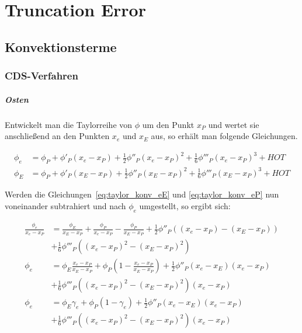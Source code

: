 \documentclass[11pt, ngerman,colorback,accentcolor=tud2d]{tudreport}
\begin{document}
\newcommand{\pder}[2][]{\frac{\partial#1}{\partial#2}}
\newcommand{\pderf}[1]{\frac{\partial f}{\partial#1}}
\newcommand{\pderfs}[1]{\frac{\partial^2 f}{\partial#1}}



\chapter{Truncation Error}
\label{cha:Truncation_Error}


\section{Konvektionsterme}

\subsection{CDS-Verfahren}

\paragraph{Osten}
Entwickelt man die Taylorreihe von $\phi$ um den Punkt $x_P$ und wertet sie anschließend
an den Punkten $x_e$ und $x_E$ aus, so erhält man folgende Gleichungen.

\begin{align}
  \phi_e &= \phi_P + \phi'_P(x_e-x_P)+\frac{1}{2}\phi''_P(x_e-x_P)^2
  +\frac{1}{6}\phi'''_P(x_e-x_P)^3+HOT
  \label{eq:taylor_konv_eP}\\
  \phi_E &= \phi_P + \phi'_P(x_E-x_P)+\frac{1}{2}\phi''_P(x_E-x_P)^2
  +\frac{1}{6}\phi'''_P(x_E-x_P)^3+HOT
  \label{eq:taylor_konv_eE}
\end{align}

Werden die Gleichungen~\eqref{eq:taylor_konv_eE} und \eqref{eq:taylor_konv_eP} nun
voneinander subtrahiert und nach $\phi_e$ umgestellt, so ergibt sich:

\begin{align*}
  \frac{\phi_e}{x_e-x_P} &= \frac{\phi_E}{x_E-x_P} + \frac{\phi_P}{x_e-x_P} -
  \frac{\phi_P}{x_E-x_P} + \frac{1}{2} \phi''_P \left({(x_e-x_P)-(x_E-x_P)}\right)\\
  &+ \frac{1}{6} \phi'''_P \left({(x_e-x_P)^2-(x_E-x_P)^2}\right)\\
  \phi_e &= \phi_E \frac{x_e-x_P}{x_E-x_P} + \phi_P \left({1-\frac{x_e-x_P}{x_E-x_P} }\right)
  + \frac{1}{2} \phi''_P (x_e-x_E)(x_e-x_P)\\
  &+ \frac{1}{6} \phi'''_P \left({(x_e-x_P)^2-(x_E-x_P)^2}\right)(x_e-x_P)\\
  \phi_e &= \phi_E \gamma_e + \phi_P (1-\gamma_e)+ \frac{1}{2} \phi''_P (x_e-x_E)(x_e-x_P)\\
         &+ \frac{1}{6} \phi'''_P \left({(x_e-x_P)^2-(x_E-x_P)^2}\right)(x_e-x_P)
\end{align*}
\end{document}
